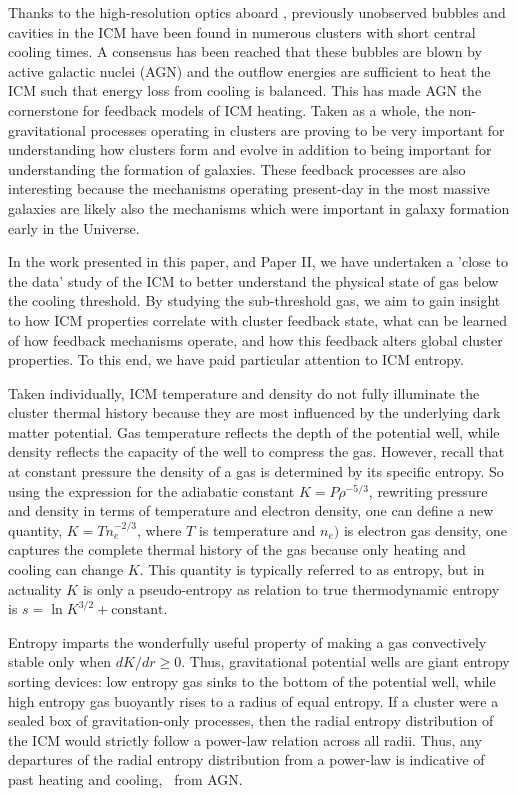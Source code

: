 \documentclass[12pt, preprint]{aastex}
\begin{document}
Thanks to the high-resolution optics aboard \Chandra, previously
unobserved bubbles and cavities in the ICM have been found in numerous
clusters with short central cooling times. A consensus has been
reached that these bubbles are blown by active galactic nuclei (AGN)
and the outflow energies are sufficient to heat the ICM such that
energy loss from cooling is balanced. This has made AGN the
cornerstone for feedback models of ICM heating. Taken as a whole, the
non-gravitational processes operating in clusters are proving to be
very important for understanding how clusters form and evolve in
addition to being important for understanding the formation of
galaxies. These feedback processes are also interesting because
the mechanisms operating present-day in the most massive galaxies are
likely also the mechanisms which were important in galaxy formation
early in the Universe.

In the work presented in this paper, and Paper II, we have undertaken
a 'close to the data' study of the ICM to better understand the
physical state of gas below the cooling threshold. By studying the
sub-threshold gas, we aim to gain insight to how ICM properties
correlate with cluster feedback state, what can be learned of how
feedback mechanisms operate, and how this feedback alters global
cluster properties. To this end, we have paid particular attention to
ICM entropy.

Taken individually, ICM temperature and density do not fully
illuminate the cluster thermal history because they are most
influenced by the underlying dark matter potential. Gas temperature
reflects the depth of the potential well, while density reflects the
capacity of the well to compress the gas. However, recall that at
constant pressure the density of a gas is determined by its specific
entropy. So using the expression for the adiabatic constant
$K=P\rho^{-5/3}$, rewriting pressure and density in terms of
temperature and electron density, one can define a new quantity, $K =
Tn_e^{-2/3}$, where $T$ is temperature and $n_e)$ is electron gas
density, one captures the complete thermal history of the gas because
only heating and cooling can change $K$. This quantity is typically
referred to as entropy, but in actuality $K$ is only a pseudo-entropy
as relation to true thermodynamic entropy is $s = \ln K^{3/2} +
\mathrm{constant}$.

Entropy imparts the wonderfully useful property of making a gas
convectively stable only when $dK/dr \geq 0$. Thus, gravitational
potential wells are giant entropy sorting devices: low entropy gas
sinks to the bottom of the potential well, while high entropy gas
buoyantly rises to a radius of equal entropy. If a cluster were a
sealed box of gravitation-only processes, then the radial entropy
distribution of the ICM would strictly follow a power-law relation
across all radii. Thus, any departures of the radial entropy
distribution from a power-law is indicative of past heating and
cooling, \ie\ from AGN.
\end{document}
